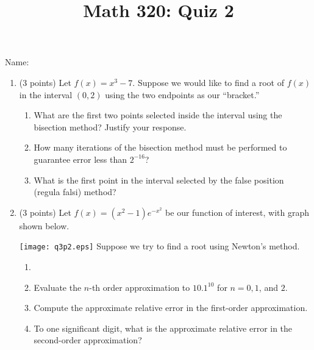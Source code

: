\documentclass[12pt]{amsart}
\begin{document}
\flushright
Name:\underline{\hspace{5cm}}
\title{Math 320: Quiz 2}
\maketitle

\begin{enumerate}
\item (3 points) Let $f(x) = x^3-7$. Suppose we would
like to find a root of $f(x)$ in the interval $(0,2)$ using the
two endpoints as our ``bracket.''

\begin{enumerate}
\item What are the first two points selected inside the 
interval using the bisection method? Justify your response.

\item How many iterations of the bisection method must be performed
to guarantee error less than $2^{-16}$?

\item What is the first point in the interval selected by
the false position (regula falsi) method?
\end{enumerate}

\vfill
\pagebreak

\item (3 points) Let $f(x) = (x^2-1)e^{-x^2}$ be our function of
interest, with graph shown below. 

\texttt{[image: q3p2.eps]}
Suppose we try to find a root using Newton's method.

\begin{enumerate}
\item 

\item Evaluate the $n$-th order approximation to $10.1^{10}$ for
$n = 0,1$, and $2$.


\item Compute the approximate relative error in the 
first-order approximation.


\item To one significant digit, what is the approximate relative error
in the second-order approximation?



\end{enumerate}


\end{enumerate}
\end{document}
